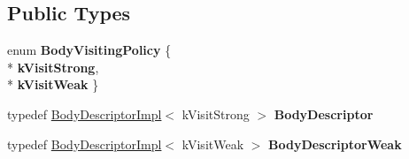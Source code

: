 \subsection*{Public Types}
\begin{DoxyCompactItemize}
\item 
enum {\bfseries Body\+Visiting\+Policy} \{ \\*
{\bfseries k\+Visit\+Strong}, 
\\*
{\bfseries k\+Visit\+Weak}
 \}\hypertarget{classv8_1_1internal_1_1_j_s_weak_collection_aaf7f8405c5b468c72a8931e845fc37f3}{}\label{classv8_1_1internal_1_1_j_s_weak_collection_aaf7f8405c5b468c72a8931e845fc37f3}

\item 
typedef \hyperlink{classv8_1_1internal_1_1_j_s_weak_collection_1_1_body_descriptor_impl}{Body\+Descriptor\+Impl}$<$ k\+Visit\+Strong $>$ {\bfseries Body\+Descriptor}\hypertarget{classv8_1_1internal_1_1_j_s_weak_collection_a60f7d47c6208872ffdc93a384a975bfd}{}\label{classv8_1_1internal_1_1_j_s_weak_collection_a60f7d47c6208872ffdc93a384a975bfd}

\item 
typedef \hyperlink{classv8_1_1internal_1_1_j_s_weak_collection_1_1_body_descriptor_impl}{Body\+Descriptor\+Impl}$<$ k\+Visit\+Weak $>$ {\bfseries Body\+Descriptor\+Weak}\hypertarget{classv8_1_1internal_1_1_j_s_weak_collection_a1b9ad5e17fb8725f9fbf4a17a97fdb5b}{}\label{classv8_1_1internal_1_1_j_s_weak_collection_a1b9ad5e17fb8725f9fbf4a17a97fdb5b}

\end{DoxyCompactItemize}
